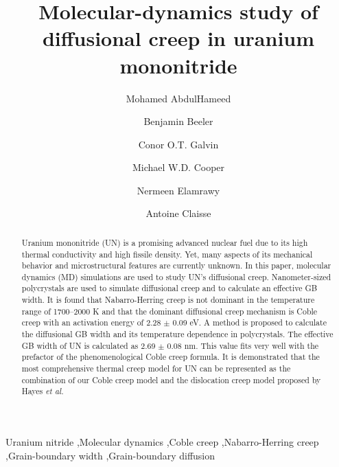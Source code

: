 \documentclass[preprint,12pt,sort&compress]{elsarticle}
\newcommand{\?}{\stackrel{?}{=}}
\begin{document}
\begin{frontmatter}

\title{Molecular-dynamics study of diffusional creep in uranium mononitride}

\author[ncsu]{Mohamed AbdulHameed}
\author[ncsu,inl]{Benjamin Beeler}
\author[lanl]{Conor O.T. Galvin}
\author[lanl]{Michael W.D. Cooper}
\author[ncsu]{Nermeen Elamrawy}
\author[west]{Antoine Claisse}

\address[ncsu]{Department of Nuclear Engineering, North Carolina State University, Raleigh, NC 27695}
\address[inl]{Idaho National Laboratory, Idaho Falls, ID 83415}
\address[west]{Westinghouse Electric Sweden, Västerås, SE 72163, Sweden}
\address[lanl]{Los Alamos National Laboratory, Los Alamos, NM 87545}

\begin{abstract}

Uranium mononitride (UN) is a promising advanced nuclear fuel due to its high thermal conductivity and high fissile density. Yet, many aspects of its mechanical behavior and microstructural features are currently unknown. In this paper, molecular dynamics (MD) simulations are used to study UN's diffusional creep. Nanometer-sized polycrystals are used to simulate diffusional creep and to calculate an effective GB width. It is found that Nabarro-Herring creep is not dominant in the temperature range of 1700--2000 K and that the dominant diffusional creep mechanism is Coble creep with an activation energy of 2.28 $\pm$ 0.09 eV. A method is proposed to calculate the diffusional GB width and its temperature dependence in polycrystals. The effective GB width of UN is calculated as 2.69 $\pm$ 0.08 nm. This value fits very well with the prefactor of the phenomenological Coble creep formula. It is demonstrated that the most comprehensive thermal creep model for UN can be represented as the combination of our Coble creep model and the dislocation creep model proposed by Hayes \textit{et al.}

\end{abstract}

\begin{keyword}
Uranium nitride \sep Molecular dynamics \sep Coble creep \sep Nabarro-Herring creep \sep Grain-boundary width \sep Grain-boundary diffusion
\end{keyword}

\end{frontmatter}
\end{document}
